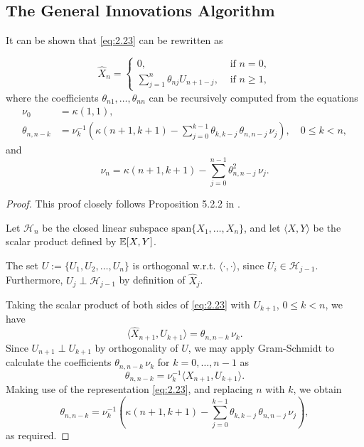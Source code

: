 \documentclass[a4paper, oneside]{discothesis}
\begin{document}
\subsection{The General Innovations Algorithm}

It can be shown that \eqref{eq:2.23} can be rewritten as

\begin{equation}
    \label{eq:innov}\hat{X}_n =
    \begin{cases}
        0, & \text{ if }n = 0, \\
       \sum_{j=1}^n \theta_{nj} U_{n+1-j}, & \text{ if } n \geq 1,
    \end{cases}
\end{equation}
where the coefficients $\theta_{n1}, \dots, \theta_{nn}$ can be recursively computed from the equations
\begin{align}
    \nu_0 &= \kappa(1, 1), \\
    \theta_{n, n-k} &= \nu_k^{-1} \left(\kappa(n+1, k+1) -\sum_{j=0}^{k-1}\theta_{k,k-j}\,\theta_{n, n-j}\,\nu_j\right), \quad 0\leq k <n,
\end{align}
and
\begin{equation}
    \nu_n = \kappa(n+1, k+1) - \sum_{j=0}^{n-1} \theta_{n,n-j}^2\,\nu_j.
\end{equation}
\begin{proof}
    This proof closely follows Proposition 5.2.2 in \cite{tstm}.

    Let $\mathcal{H}_n$ be the closed linear subspace $\mathrm{span}\{X_1, \dots, X_n\}$, and let $\langle X, Y \rangle$ be the scalar product defined by $\operatorname{\mathbb{E}}[X, Y]$.
    
    The set $U := \{U_1, U_2, \dots, U_n\}$ is orthogonal w.r.t. $\langle \cdot, \cdot \rangle$, since $U_i \in \mathcal{H}_{j-1}$. Furthermore, $U_j \perp \mathcal{H}_{j-1}$ by definition of $\hat{X}_j$.
    
    Taking the scalar product of both sides of \eqref{eq:2.23} with $U_{k+1}$, $0 \leq k < n$, we have 
    \begin{equation}
        \langle \hat{X}_{n+1}, U_{k+1}\rangle = \theta_{n, n-k}\,\nu_k.
    \end{equation}
    Since $U_{n+1} \perp U_{k+1}$ by orthogonality of $U$, we may apply Gram-Schmidt to calculate the coefficients $\theta_{n, n-k}\,\nu_k$ for $k = 0, \dots, n-1$ as
    \begin{equation}
        \theta_{n, n-k} = \nu_k^{-1} \langle X_{n+1}, U_{k+1}\rangle.
    \end{equation}
    Making use of the representation \eqref{eq:2.23}, and replacing $n$ with $k$, we obtain
    \begin{equation}
         \theta_{n, n-k} = \nu_k^{-1} \left(\kappa(n+1, k+1) - \sum_{j=0}^{k-1} \theta_{k, k-j}\,\theta_{n, n-j}\,\nu_j \right),
    \end{equation}
    as required.
\end{proof}
\newpage
\enlargethispage{3\baselineskip}
\end{document}
